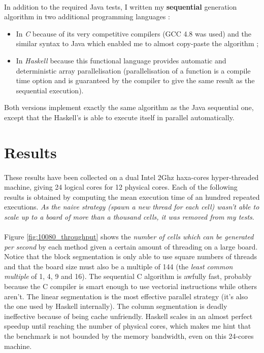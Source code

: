 \documentclass[a4paper]{article}
\begin{document}
    \paragraph{}In addition to the required Java tests, I written my
\textbf{sequential} generation algorithm in two additional programming
languages :
    \begin{itemize}
        \item In \textit{C} because of its very competitive compilers (GCC 4.8
was used) and the similar syntax to Java which enabled me to almost copy-paste
the algorithm ;
        \item In \textit{Haskell} because this functional language provides
automatic and deterministic array parallelisation (parallelisation of a function
is a compile time option and is guaranteed by the compiler to give the same
result as the sequential execution).
    \end{itemize}
Both versions implement exactly the same algorithm as the Java sequential one,
except that the Haskell's is able to execute itself in parallel automatically.

  \section{Results}

    \paragraph{}These results have been collected on a dual Intel 2Ghz
haxa-cores hyper-threaded machine, giving 24 logical cores for 12 physical
cores. Each of the following results is obtained by  computing the mean
execution time of an hundred repeated executions. \textit{As the naive strategy
(spawn a new thread for each cell) wasn't able to scale up to a board of more
than a thousand cells, it was removed from my tests}.

    \paragraph{}Figure \ref{fig:10080_throughput} shows the \textit{number of
cells which can be generated per second} by each method given a certain amount
of threading on a large board. Notice that the block segmentation is only able
to use square numbers of threads and that the board size must also be a multiple
of 144 (the \textit{least common multiple} of 1, 4, 9 and 16). \newline
The sequential C algorithm is awfully fast, probably because the C compiler is
smart enough to use vectorial instructions while others aren't.\newline
The linear segmentation is the most effective parallel strategy (it's also the
one used by Haskell internally). The column segmentation is deadly ineffective
because of being cache unfriendly. Haskell scales in an almost perfect speedup
until reaching the number of physical cores, which makes me hint that the
benchmark is not bounded by the memory bandwidth, even on this 24-cores machine.
\end{document}
